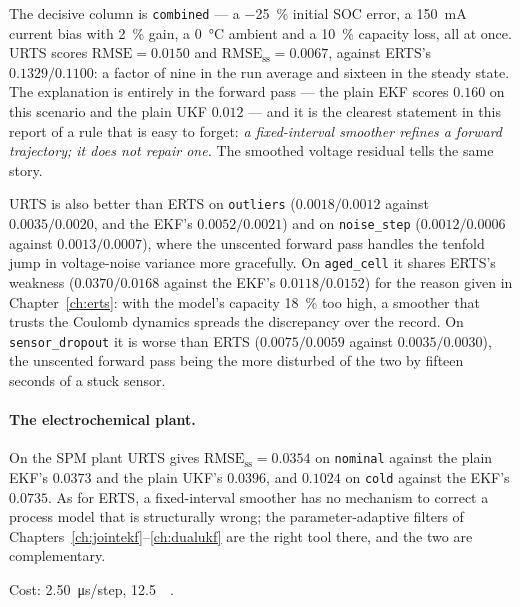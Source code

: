 The decisive column is \texttt{combined} --- a \SI{-25}{\percent} initial SOC error, a
\SI{150}{\milli\ampere} current bias with \SI{+2}{\percent} gain, a \SI{0}{\celsius} ambient and a
\SI{10}{\percent} capacity loss, all at once.  URTS scores $\text{RMSE}=0.0150$ and
$\text{RMSE}_\text{ss}=0.0067$, against ERTS's $0.1329/0.1100$: a factor of nine in the run average
and sixteen in the steady state.  The explanation is entirely in the forward pass --- the plain EKF
scores $0.160$ on this scenario and the plain UKF $0.012$ --- and it is the clearest statement in this report of a rule that is easy to
forget: \emph{a fixed-interval smoother refines a forward trajectory; it does not repair one.}  The
smoothed voltage residual tells the same story.

URTS is also better than ERTS on \texttt{outliers} ($0.0018/0.0012$ against $0.0035/0.0020$, and the
EKF's $0.0052/0.0021$) and on \texttt{noise\_step} ($0.0012/0.0006$ against $0.0013/0.0007$), where
the unscented forward pass handles the tenfold jump in voltage-noise variance more gracefully.  On
\texttt{aged\_cell} it shares ERTS's weakness ($0.0370/0.0168$ against the EKF's $0.0118/0.0152$)
for the reason given in Chapter~\ref{ch:erts}: with the model's capacity \SI{18}{\percent} too high,
a smoother that trusts the Coulomb dynamics spreads the discrepancy over the record.  On
\texttt{sensor\_dropout} it is worse than ERTS ($0.0075/0.0059$ against $0.0035/0.0030$), the
unscented forward pass being the more disturbed of the two by fifteen seconds of a stuck sensor.

\paragraph{The electrochemical plant.}  On the SPM plant URTS gives $\text{RMSE}_\text{ss}=0.0354$
on \texttt{nominal} against the plain EKF's $0.0373$ and the plain UKF's $0.0396$, and $0.1024$ on
\texttt{cold} against the EKF's $0.0735$.  As for ERTS, a fixed-interval smoother has no mechanism
to correct a process model that is structurally wrong; the parameter-adaptive filters of
Chapters~\ref{ch:jointekf}--\ref{ch:dualukf} are the right tool there, and the two are
complementary.

Cost: \SI{2.50}{\micro\second}/step, \SI{12.5}{\mega\byte}.

